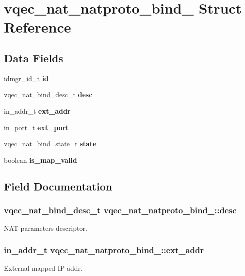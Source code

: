 \section{vqec\_\-nat\_\-natproto\_\-bind\_\- Struct Reference}
\label{structvqec__nat__natproto__bind__}
\subsection*{Data Fields}
\begin{CompactItemize}
\item 
idmgr\_\-id\_\-t \bf{id}
\item 
vqec\_\-nat\_\-bind\_\-desc\_\-t \bf{desc}
\item 
in\_\-addr\_\-t \bf{ext\_\-addr}
\item 
in\_\-port\_\-t \bf{ext\_\-port}
\item 
vqec\_\-nat\_\-bind\_\-state\_\-t \bf{state}
\item 
boolean \bf{is\_\-map\_\-valid}
\end{CompactItemize}


\subsection{Field Documentation}
\subsubsection{\setlength{\rightskip}{0pt plus 5cm}vqec\_\-nat\_\-bind\_\-desc\_\-t \bf{vqec\_\-nat\_\-natproto\_\-bind\_\-::desc}}\label{structvqec__nat__natproto__bind___0fe8ae2756c69f29ead2d1d6c3567990}


NAT parameters descriptor. 
\subsubsection{\setlength{\rightskip}{0pt plus 5cm}in\_\-addr\_\-t \bf{vqec\_\-nat\_\-natproto\_\-bind\_\-::ext\_\-addr}}\label{structvqec__nat__natproto__bind___9963b0a557a5d95b5219d546a7397dbe}


External mapped IP addr. 
